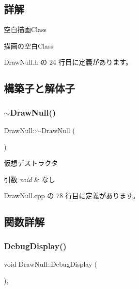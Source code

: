 \subsection{詳解}
空白描画\+Class 

描画の空白\+Class 

 Draw\+Null.\+h の 24 行目に定義があります。



\subsection{構築子と解体子}
\mbox{\label{class_draw_null_af03c2d730ff3351baf234f89cc28303b}} 
\subsubsection{\texorpdfstring{$\sim$\+Draw\+Null()}{~DrawNull()}}
{\footnotesize\ttfamily Draw\+Null\+::$\sim$\+Draw\+Null (\begin{DoxyParamCaption}{ }\end{DoxyParamCaption})\hspace{0.3cm}{\ttfamily [virtual]}}



仮想デストラクタ 


\begin{DoxyParams}{引数}
{\em void} & なし \\
\hline
\end{DoxyParams}


 Draw\+Null.\+cpp の 78 行目に定義があります。



\subsection{関数詳解}
\mbox{\label{class_draw_null_aed3bbedfe8db8daf7cafa143750f2114}} 
\subsubsection{\texorpdfstring{Debug\+Display()}{DebugDisplay()}}
{\footnotesize\ttfamily void Draw\+Null\+::\+Debug\+Display (\begin{DoxyParamCaption}{ }\end{DoxyParamCaption})\hspace{0.3cm}{\ttfamily [override]}, {\ttfamily [virtual]}}



